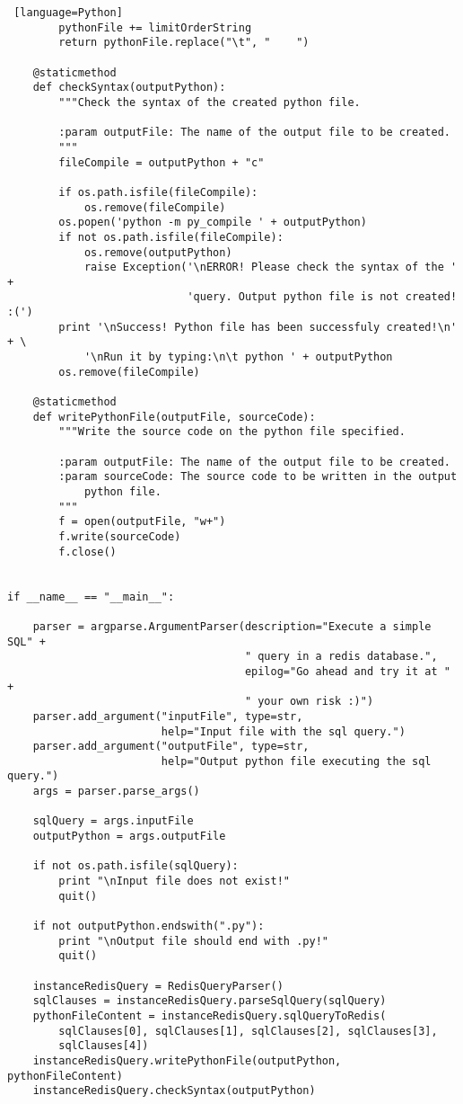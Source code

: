 \documentclass[11pt]{article}
\begin{document}
\begin{lstlisting} [language=Python]
        pythonFile += limitOrderString
        return pythonFile.replace("\t", "    ")

    @staticmethod
    def checkSyntax(outputPython):
        """Check the syntax of the created python file.

        :param outputFile: The name of the output file to be created.
        """
        fileCompile = outputPython + "c"

        if os.path.isfile(fileCompile):
            os.remove(fileCompile)
        os.popen('python -m py_compile ' + outputPython)
        if not os.path.isfile(fileCompile):
            os.remove(outputPython)
            raise Exception('\nERROR! Please check the syntax of the ' +
                            'query. Output python file is not created! :(')
        print '\nSuccess! Python file has been successfuly created!\n' + \
            '\nRun it by typing:\n\t python ' + outputPython
        os.remove(fileCompile)

    @staticmethod
    def writePythonFile(outputFile, sourceCode):
        """Write the source code on the python file specified.

        :param outputFile: The name of the output file to be created.
        :param sourceCode: The source code to be written in the output
            python file.
        """
        f = open(outputFile, "w+")
        f.write(sourceCode)
        f.close()


if __name__ == "__main__":

    parser = argparse.ArgumentParser(description="Execute a simple SQL" +
                                     " query in a redis database.",
                                     epilog="Go ahead and try it at " +
                                     " your own risk :)")
    parser.add_argument("inputFile", type=str,
                        help="Input file with the sql query.")
    parser.add_argument("outputFile", type=str,
                        help="Output python file executing the sql query.")
    args = parser.parse_args()

    sqlQuery = args.inputFile
    outputPython = args.outputFile

    if not os.path.isfile(sqlQuery):
        print "\nInput file does not exist!"
        quit()

    if not outputPython.endswith(".py"):
        print "\nOutput file should end with .py!"
        quit()

    instanceRedisQuery = RedisQueryParser()
    sqlClauses = instanceRedisQuery.parseSqlQuery(sqlQuery)
    pythonFileContent = instanceRedisQuery.sqlQueryToRedis(
        sqlClauses[0], sqlClauses[1], sqlClauses[2], sqlClauses[3],
        sqlClauses[4])
    instanceRedisQuery.writePythonFile(outputPython, pythonFileContent)
    instanceRedisQuery.checkSyntax(outputPython)

\end{lstlisting}
\end{document}
